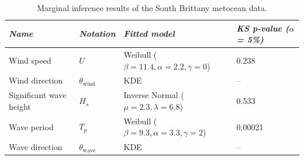 \begin{table}
    \centering
    \begin{tabular}{llll}
        \hline
        {\it Name}              & {\it Notation}            & {\it Fitted model}                            & \textit{KS p-value ($\alpha$= 5\%)} \\
        \hline
        Wind speed              & $U$                       & Weibull ($\beta=11.4, \alpha=2.2, \gamma=0$)  & 0.238     \\
        Wind direction          & $\theta_{\mathrm{wind}}$  & KDE                                           & --        \\ 
        Significant wave height & $H_s$                     & Inverse Normal ($\mu=2.3, \lambda=6.8$)       & 0.533     \\
        Wave period             & $T_p$                     & Weibull ($\beta=9.3, \alpha=3.3, \gamma=2$)  & 0.00021   \\
        Wave direction          & $\theta_{\mathrm{wave}}$  & KDE                                           & --        \\
        \hline
    \end{tabular}
    \caption{Marginal inference results of the South Brittany metocean data.}
    \label{tab:sb_marginal_fit}
\end{table}

